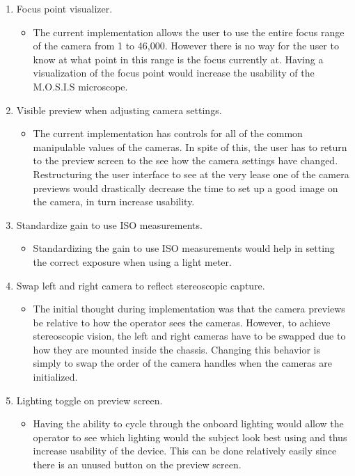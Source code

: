 \begin{enumerate}
\begin{itemize}
          \end{itemize}
	\item Focus point visualizer.
          \begin{itemize}
            \item The current implementation allows the user to use the entire focus range of the camera from 1 to 46,000. However there is no way for the user to know at what point in this range is the focus currently at. Having a visualization of the focus point would increase the usability of the M.O.S.I.S microscope.
          \end{itemize}
	\item Visible preview when adjusting camera settings.
          \begin{itemize}
            \item The current implementation has controls for all of the common manipulable values of the cameras. In spite of this, the user has to return to the preview screen to the see how the camera settings have changed. Restructuring the user interface to see at the very lease one of the camera previews would drastically decrease the time to set up a good image on the camera, in turn increase usability.
          \end{itemize}
	\item Standardize gain to use ISO measurements.
          \begin{itemize}
            \item Standardizing the gain to use ISO measurements would help in setting the correct exposure when using a light meter.
          \end{itemize}
	\item Swap left and right camera to reflect stereoscopic capture.
          \begin{itemize}
            \item The initial thought during implementation was that the camera previews be relative to how the operator sees the cameras. However, to achieve stereoscopic vision, the left and right cameras have to be swapped due to how they are mounted inside the chassis. Changing this behavior is simply to swap the order of the camera handles when the cameras are initialized.
          \end{itemize}
	\item Lighting toggle on preview screen.
          \begin{itemize}
            \item Having the ability to cycle through the onboard lighting would allow the operator to see which lighting would the subject look best using and thus increase usability of the device. This can be done relatively easily since there is an unused button on the preview screen.
          \end{itemize}
\end{enumerate}